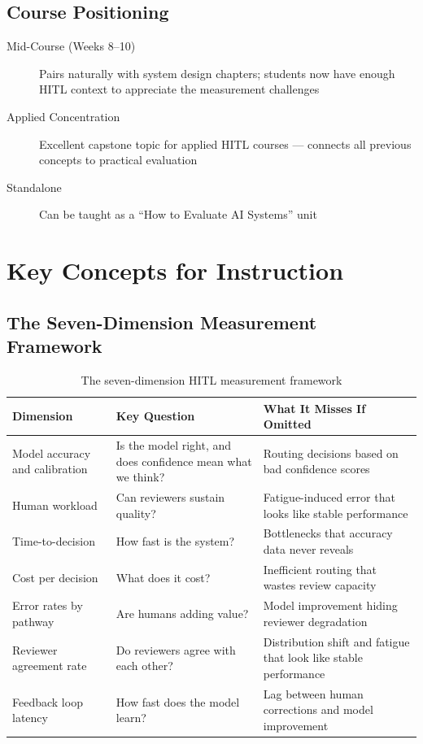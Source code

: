 \subsection{Course Positioning}

\begin{description}
    \item[Mid-Course (Weeks 8--10)] Pairs naturally with system design chapters; students now have enough HITL context to appreciate the measurement challenges
    \item[Applied Concentration] Excellent capstone topic for applied HITL courses --- connects all previous concepts to practical evaluation
    \item[Standalone] Can be taught as a ``How to Evaluate AI Systems'' unit
\end{description}

\section{Key Concepts for Instruction}

\subsection{The Seven-Dimension Measurement Framework}

\begin{table}[htbp]
\caption{The seven-dimension HITL measurement framework}
\label{tab:seven-dim-framework}
\centering
\begin{tabular}{@{}p{3cm}p{4cm}p{4.5cm}@{}}
\toprule
\textbf{Dimension} & \textbf{Key Question} & \textbf{What It Misses If Omitted} \\
\midrule
Model accuracy and calibration & Is the model right, and does confidence mean what we think? & Routing decisions based on bad confidence scores \\
Human workload & Can reviewers sustain quality? & Fatigue-induced error that looks like stable performance \\
Time-to-decision & How fast is the system? & Bottlenecks that accuracy data never reveals \\
Cost per decision & What does it cost? & Inefficient routing that wastes review capacity \\
Error rates by pathway & Are humans adding value? & Model improvement hiding reviewer degradation \\
Reviewer agreement rate & Do reviewers agree with each other? & Distribution shift and fatigue that look like stable performance \\
Feedback loop latency & How fast does the model learn? & Lag between human corrections and model improvement \\
\bottomrule
\end{tabular}
\end{table}

